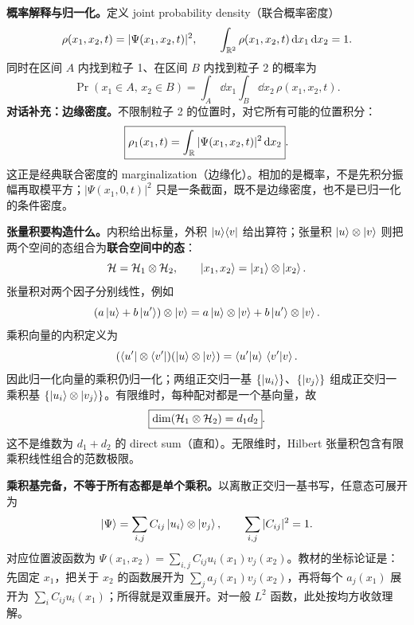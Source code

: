 \textbf{概率解释与归一化。}定义 joint probability density（联合概率密度）
\begin{equation}
  \rho(x_1,x_2,t)=|\Psi(x_1,x_2,t)|^2,\qquad
  \int_{\mathbb{R}^2}\rho(x_1,x_2,t)\mathop{}\!\mathrm{d} x_1\mathop{}\!\mathrm{d} x_2=1.
\end{equation}
同时在区间 $A$ 内找到粒子 1、在区间 $B$ 内找到粒子 2 的概率为
\begin{equation}
  \Pr(x_1\in A,\,x_2\in B)
  =\int_A\dd x_1\int_B\dd x_2\,\rho(x_1,x_2,t).
\end{equation}
\textbf{对话补充：边缘密度。}不限制粒子 2 的位置时，对它所有可能的位置积分：
\begin{equation}
  \boxed{\rho_1(x_1,t)=\int_{\mathbb{R}}|\Psi(x_1,x_2,t)|^2\mathop{}\!\mathrm{d} x_2}.
  \label{eq:QM-C10-S01-marginal}
\end{equation}
这正是经典联合密度的 marginalization（边缘化）。相加的是概率，不是先积分振幅再取模平方；$|\Psi(x_1,0,t)|^2$ 只是一条截面，既不是边缘密度，也不是已归一化的条件密度。

\textbf{张量积要构造什么。}内积给出标量，外积 $\left|u\right\rangle\!\left\langle v\right|$ 给出算符；张量积 $\left|u\right\rangle\otimes\left|v\right\rangle$ 则把两个空间的态组合为\textbf{联合空间中的态}：
\begin{equation}
  \mathcal{H}=\mathcal{H}_1\otimes\mathcal{H}_2,\qquad
  \left|x_1,x_2\right\rangle=\left|x_1\right\rangle\otimes\left|x_2\right\rangle.
\end{equation}
张量积对两个因子分别线性，例如
\begin{equation}
  (a\left|u\right\rangle+b\left|u'\right\rangle)\otimes\left|v\right\rangle
   =a\left|u\right\rangle\otimes\left|v\right\rangle+b\left|u'\right\rangle\otimes\left|v\right\rangle.
\end{equation}
乘积向量的内积定义为
\begin{equation}
  (\left\langle u'\right|\otimes\left\langle v'\right|)(\left|u\right\rangle\otimes\left|v\right\rangle)
    =\left\langle u' \middle| u \right\rangle\,\left\langle v' \middle| v \right\rangle.
\end{equation}
因此归一化向量的乘积仍归一化；两组正交归一基 $\{\left|u_i\right\rangle\}$、$\{\left|v_j\right\rangle\}$ 组成正交归一乘积基 $\{\left|u_i\right\rangle\otimes\left|v_j\right\rangle\}$。有限维时，每种配对都是一个基向量，故
\begin{equation}
  \boxed{\dim(\mathcal{H}_1\otimes\mathcal{H}_2)=d_1d_2}.
\end{equation}
这不是维数为 $d_1+d_2$ 的 direct sum（直和）。无限维时，Hilbert 张量积包含有限乘积线性组合的范数极限。

\textbf{乘积基完备，不等于所有态都是单个乘积。}以离散正交归一基书写，任意态可展开为
\begin{equation}
  \left|\Psi\right\rangle=\sum_{i,j}C_{ij}\left|u_i\right\rangle\otimes\left|v_j\right\rangle,\qquad
  \sum_{i,j}|C_{ij}|^2=1.
  \label{eq:QM-C10-S01-product-basis}
\end{equation}
对应位置波函数为 $\Psi(x_1,x_2)=\sum_{i,j}C_{ij}u_i(x_1)v_j(x_2)$。教材的坐标论证是：先固定 $x_1$，把关于 $x_2$ 的函数展开为 $\sum_j a_j(x_1)v_j(x_2)$，再将每个 $a_j(x_1)$ 展开为 $\sum_i C_{ij}u_i(x_1)$；所得就是双重展开。对一般 $L^2$ 函数，此处按均方收敛理解。


